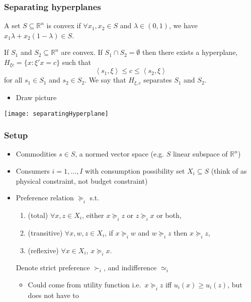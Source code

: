 \documentclass[compress]{beamer}
\def\R{\mathbb{R}}
\newcommand{\iprod}[2]{\left\langle {#1} , {#2} \right\rangle}
\newcommand{\prefeq}{\succeq}
\newcommand{\pref}{\succ}
\begin{document}
\begin{frame}
  \frametitle{Separating hyperplanes}
  \begin{definition}
    A set $S \subseteq \R^n$ is convex if $\forall x_1, x_2 \in S$ and
    $\lambda \in (0,1)$, we have $x_1 \lambda + x_2(1-\lambda) \in S$.  
  \end{definition}
  \begin{theorem}
    If $S_1$ and $S_2 \subseteq \R^n$ are convex. If $S_1 \cap S_2 =
    \emptyset$ then there exists a hyperplane, $H_{\xi c} = \{ x:
    \xi'x = c \}$ such that
    \[ \iprod{s_1}{\xi} \leq c \leq \iprod{s_2}{\xi} \]
    for all $s_1 \in S_1$ and $s_2 \in S_2$. We say that $H_{\xi,c}$
    separates $S_1$ and $S_2$. 
  \end{theorem}
  \begin{itemize}
  \item Draw picture
  \end{itemize}
\end{frame}

\begin{frame}
  \begin{centering}
    \texttt{[image: separatingHyperplane]}
  \end{centering}
\end{frame}



\begin{frame}
  \frametitle{Setup}
  \begin{itemize}
  \item Commodities $s \in S$, a normed vector space (e.g. $S$ linear
    subspace of $\R^n$)
  \item Consumers $i=1,..., I$ with consumption possibility set $X_i
    \subseteq S$
    (think of as physical constraint, not budget constraint)
  \item Preference relation $\prefeq_i$ s.t.
    \begin{enumerate}
    \item (total) $\forall x, z \in X_i$, either $x \prefeq_i z$ or $z
      \prefeq_i x$ or both,
    \item (transitive) $\forall x, w, z \in X_i$, if $x \prefeq_i w$ and $w
      \prefeq_i z$ then $x \prefeq_i z$,
    \item (reflexive) $\forall x \in X_i$, $x \prefeq_i x$.
    \end{enumerate}
    Denote strict preference $\pref_i$, and indifference $\simeq_i$
    \begin{itemize}
    \item Could come from  utility function i.e.\ $x \prefeq_i z$ iff
      $u_i(x) \geq u_i(z)$, but does not have to
    \end{itemize}    
  \end{itemize}
\end{frame}
\end{document}
